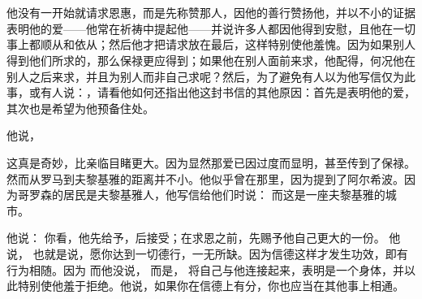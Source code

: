 

\section{}

\par

\par

他没有一开始就请求恩惠，而是先称赞那人，因他的善行赞扬他，并以不小的证据表明他的爱——他常在祈祷中提起他——并说许多人都因他得到安慰，且他在一切事上都顺从和依从；然后他才把请求放在最后，这样特别使他羞愧。\newline{}因为如果别人得到他们所求的，那么保禄更应得到；如果他在别人面前来求，他配得，何况他在别人之后来求，并且为别人而非自己求呢？然后，为了避免有人以为他写信仅为此事，或有人说：，请看他如何还指出他这封书信的其他原因：首先是表明他的爱，其次也是希望为他预备住处。\par

他说，\par

这真是奇妙，比亲临目睹更大。因为显然那爱已因过度而显明，甚至传到了保禄。然而从罗马到夫黎基雅的距离并不小。他似乎曾在那里，因为提到了阿尔希波。因为哥罗森的居民是夫黎基雅人，他写信给他们时说：  而这是一座夫黎基雅的城市。\par

他说： 你看，他先给予，后接受；在求恩之前，先赐予他自己更大的一份。 他说， 也就是说，愿你达到一切德行，一无所缺。因为信德这样才发生功效，即有行为相随。因为  而他没说， 而是， 将自己与他连接起来，表明是一个身体，并以此特别使他羞于拒绝。他说，如果你在信德上有分，你也应当在其他事上相通。\par

